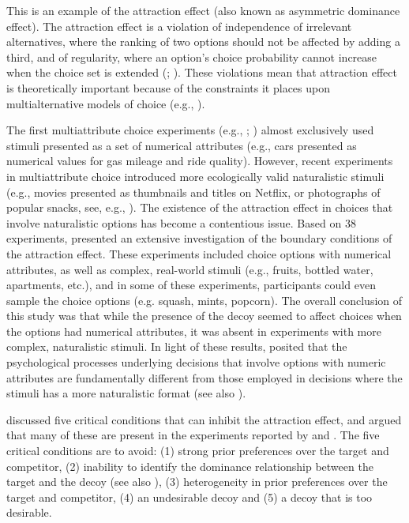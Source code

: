 \documentclass[12pt, a4paper]{article}
\begin{document}
This is an example of the attraction effect (also known as asymmetric dominance effect). The attraction effect is a violation of independence of irrelevant alternatives, where the ranking of two options should not be affected by adding a third, and of regularity, where an option's choice probability cannot increase when the choice set is extended (\cite{Luce1977a}; ). These violations mean that attraction effect is theoretically important because of the constraints it places upon multialternative models of choice (e.g., ).

The first multiattribute choice experiments (e.g., ; ) almost exclusively used stimuli presented as a set of numerical attributes (e.g., cars presented as numerical values for gas mileage and ride quality). However, recent experiments in multiattribute choice introduced more ecologically valid naturalistic stimuli (e.g., movies presented as thumbnails and titles on Netflix, or photographs of popular snacks, see, e.g., ). The existence of the attraction effect in choices that involve naturalistic options has become a contentious issue. Based on 38 experiments,  presented an extensive investigation of the boundary conditions of the attraction effect. These experiments included choice options with numerical attributes, as well as complex, real-world stimuli (e.g., fruits, bottled water, apartments, etc.), and in some of these experiments, participants could even sample the choice options (e.g. squash, mints, popcorn). The overall conclusion of this study was that while the presence of the decoy seemed to affect choices when the options had numerical attributes, it was absent in experiments with more complex, naturalistic stimuli. In light of these results, \citeauthor{Frederick2014} posited that the psychological processes underlying decisions that involve options with numeric attributes are fundamentally different from those employed in decisions where the stimuli has a more naturalistic format (see also ). 

 discussed five critical conditions that can inhibit the attraction effect, and argued that many of these are present in the experiments reported by  and . The five critical conditions are to avoid: (1) strong prior preferences over the target and competitor, (2) inability to identify the dominance relationship between the target and the decoy (see also ), (3) heterogeneity in prior preferences over the target and competitor, (4) an undesirable decoy and (5) a decoy that is too desirable. 
\end{document}
